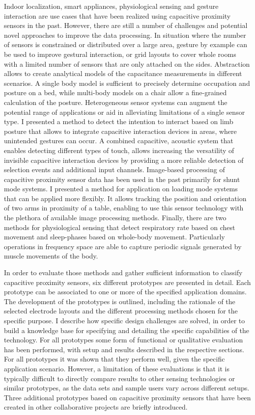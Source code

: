 Indoor localization, smart appliances, physiological sensing and gesture interaction are use cases that have been realized using capacitive proximity sensors in the past. However, there are still a number of challenges and potential novel approaches to improve the data processing. In situation where the number of sensors is constrained or distributed over a large area, gesture by example can be used to improve gestural interaction, or grid layouts to cover whole rooms with a limited number of sensors that are only attached on the sides. Abstraction allows to create analytical models of the capacitance measurements in different scenarios. A single body model is sufficient to precisely determine occupation and posture on a bed, while multi-body models on a chair allow a fine-grained calculation of the posture. Heterogeneous sensor systems can augment the potential range of applications or aid in alleviating limitations of a single sensor type. I presented a method to detect the intention to interact based on limb posture that allows to integrate capacitive interaction devices in areas, where unintended gestures can occur. A combined capacitive, acoustic system that enables detecting different types of touch, allows increasing the versatility of invisible capacitive interaction devices by providing a more reliable detection of selection events and additional input channels. Image-based processing of capacitive proximity sensor data has been used in the past primarily for shunt mode systems. I presented a method for application on loading mode systems that can be applied more flexibly. It allows tracking the position and orientation of two arms in proximity of a table, enabling to use this sensor technology with the plethora of available image processing methods. Finally, there are two methods for physiological sensing that detect respiratory rate based on chest movement and sleep-phases based on whole-body movement. Particularly operations in frequency space are able to capture periodic signals generated by muscle movements of the body.

In order to evaluate those methods and gather sufficient information to classify capacitive proximity sensors, six different prototypes are presented in detail. Each prototype can be associated to one or more of the specified application domains. The development of the prototypes is outlined, including the rationale of the selected electrode layouts and the different processing methods chosen for the specific purpose. I describe how specific design challenges are solved, in order to build a knowledge base for specifying and detailing the specific capabilities of the technology. For all prototypes some form of functional or qualitative evaluation has been performed, with setup and results described in the respective sections. For all prototypes it was shown that they perform well, given the specific application scenario. However, a limitation of these evaluations is that it is typically difficult to directly compare results to other sensing technologies or similar prototypes, as the data sets and sample users vary across different setups. Three additional prototypes based on capacitive proximity sensors that have been created in other collaborative projects are briefly introduced.
 
